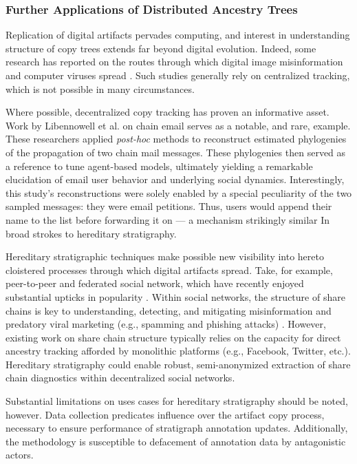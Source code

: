 \subsubsection{Further Applications of Distributed Ancestry Trees}

Replication of digital artifacts pervades computing, and interest in understanding structure of copy trees extends far beyond digital evolution.
Indeed, some research has reported on the routes through which digital image misinformation and computer viruses spread \citep{friggeri2014rumor,cohen1987computer}.
Such studies generally rely on centralized tracking, which is not possible in many circumstances.

Where possible, decentralized copy tracking has proven an informative asset.
Work by Libennowell et al. on chain email serves as a notable, and rare, example.
These researchers applied \textit{post-hoc} methods to reconstruct estimated phylogenies of the propagation of two chain mail messages.
These phylogenies then served as a reference to tune agent-based models, ultimately yielding a remarkable elucidation of email user behavior and underlying social dynamics.
Interestingly, this study's reconstructions were solely enabled by a special peculiarity of the two sampled messages: they were email petitions.
Thus, users would append their name to the list before forwarding it on --- a mechanism strikingly similar In broad strokes to hereditary stratigraphy.

Hereditary stratigraphic techniques make possible new visibility into hereto cloistered processes through which digital artifacts spread.
Take, for example, peer-to-peer and federated social network, which have recently enjoyed substantial upticks in popularity \citep{la2021understanding}.
Within social networks, the structure of share chains is key to understanding, detecting, and mitigating misinformation \citep{kucharski2016study,raponi2022fake} and predatory viral marketing (e.g., spamming and phishing attacks) \citep{guidi2018managing}.
However, existing work on share chain structure typically relies on the capacity for direct ancestry tracking afforded by monolithic platforms (e.g., Facebook, Twitter, etc.).
Hereditary stratigraphy could enable robust, semi-anonymized extraction of share chain diagnostics within decentralized social networks.

Substantial limitations on uses cases for hereditary stratigraphy should be noted, however.
Data collection predicates influence over the artifact copy process, necessary to ensure performance of stratigraph annotation updates.
Additionally, the methodology is susceptible to defacement of annotation data by antagonistic actors.
